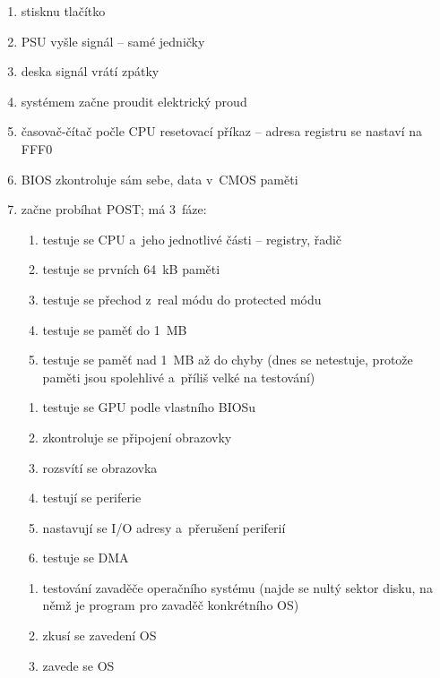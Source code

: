 \documentclass[a4paper,12pt]{article}
\newcommand*\circled[1]{\tikz[baseline=(char.base)]{
            \node[shape=circle,draw,inner sep=2pt] (char) {#1};}}
\providecommand{\tightlist}{%
\setlength{\itemsep}{0pt}\setlength{\parskip}{0pt}}
\begin{document}
\begin{enumerate}
  \tightlist
  \item stisknu tlačítko
  \item PSU vyšle signál -- samé jedničky
  \item deska signál vrátí zpátky
  \item systémem začne proudit elektrický proud
  \item časovač-čítač počle CPU resetovací příkaz -- adresa registru se nastaví na FFF0
  \item BIOS zkontroluje sám sebe, data v~CMOS paměti
  \item začne probíhat POST; má 3~fáze:

  \circled{1}

  \begin{enumerate}[label=\arabic*)]
    \tightlist
    \item testuje se CPU a~jeho jednotlivé části -- registry, řadič
    \item testuje se prvních 64~kB paměti
    \item testuje se přechod z~real módu do protected módu
    \item testuje se paměť do 1~MB
    \item testuje se paměť nad 1~MB až do chyby (dnes se netestuje, protože
    paměti jsou spolehlivé a~příliš velké na testování)
  \end{enumerate}

  \circled{2}

  \begin{enumerate}[label=\arabic*)]
    \tightlist
    \item testuje se GPU podle vlastního BIOSu
    \item zkontroluje se připojení obrazovky
    \item rozsvítí se obrazovka
    \item testují se periferie
    \item nastavují se I/O adresy a~přerušení periferií
    \item testuje se DMA
  \end{enumerate}

  \circled{3}

  \begin{enumerate}[label=\arabic*)]
    \tightlist
    \item testování zavaděče operačního systému (najde se nultý sektor disku, na
    němž je program pro zavaděč konkrétního OS)
    \item zkusí se zavedení OS
    \item zavede se OS
  \end{enumerate}
\end{enumerate}
\end{document}
